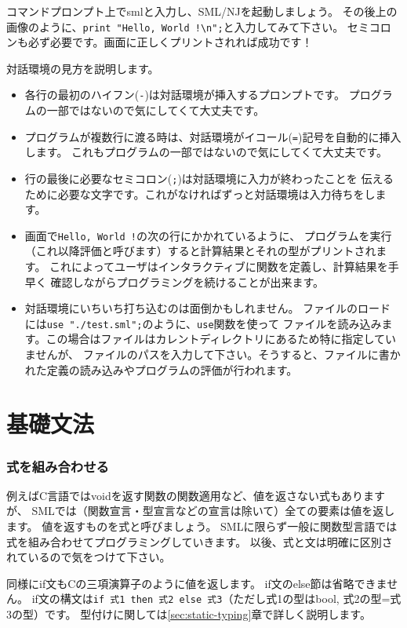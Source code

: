 \documentclass[11pt,a4paper]{article}
\begin{document}
コマンドプロンプト上でsmlと入力し、SML/NJを起動しましょう。
その後上の画像のように、\lstinline{print "Hello, World !\n";}と入力してみて下さい。
セミコロンも必ず必要です。画面に正しくプリントされれば成功です！

対話環境の見方を説明します。
\begin{itemize}
\item 各行の最初のハイフン(\lstinline{-})は対話環境が挿入するプロンプトです。
  プログラムの一部ではないので気にしてくて大丈夫です。
\item プログラムが複数行に渡る時は、対話環境がイコール(\lstinline{=})記号を自動的に挿入します。
  これもプログラムの一部ではないので気にしてくて大丈夫です。
\item 行の最後に必要なセミコロン(\lstinline{;})は対話環境に入力が終わったことを
  伝えるために必要な文字です。これがなければずっと対話環境は入力待ちをします。
\item 画面で\lstinline{Hello, World !}の次の行にかかれているように、
  プログラムを実行（これ以降評価と呼びます）すると計算結果とそれの型がプリントされます。
  これによってユーザはインタラクティブに関数を定義し、計算結果を手早く
  確認しながらプログラミングを続けることが出来ます。
\item 対話環境にいちいち打ち込むのは面倒かもしれません。
  ファイルのロードには\lstinline{use "./test.sml";}のように、\lstinline{use}関数を使って
  ファイルを読み込みます。この場合はファイルはカレントディレクトリにあるため特に指定していませんが、
  ファイルのパスを入力して下さい。そうすると、ファイルに書かれた定義の読み込みやプログラムの評価が行われます。
\end{itemize}

\part{基礎文法}

\section{式を組み合わせる}

例えばC言語ではvoidを返す関数の関数適用など、値を返さない式もありますが、
SMLでは（関数宣言・型宣言などの宣言は除いて）全ての要素は値を返します。
値を返すものを式と呼びましょう。
SMLに限らず一般に関数型言語では式を組み合わせてプログラミングしていきます。
以後、式と文は明確に区別されているので気をつけて下さい。

同様にif文もCの三項演算子のように値を返します。
if文のelse節は省略できません。
if文の構文は\lstinline{if 式1 then 式2 else 式3}（ただし式1の型はbool, 式2の型=式3の型）です。
型付けに関しては\ref{sec:static-typing}章で詳しく説明します。
\end{document}
